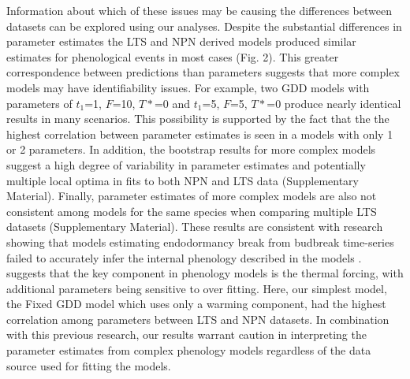 \documentclass[fleqn,10pt,lineno]{wlpeerj} %
\begin{document}
Information about which of these issues may be causing the differences between datasets can be explored using our analyses. Despite the substantial differences in parameter estimates the LTS and NPN derived models produced similar estimates for phenological events in most cases (Fig. 2). This greater correspondence between predictions than parameters suggests that more complex models may have identifiability issues. For example, two GDD models with parameters of $t_{1}$=1, $F$=10, $T*$=0 and $t_{1}$=5, $F$=5, $T*$=0 produce nearly identical results in many scenarios. This possibility is supported by the fact that the the highest correlation between parameter estimates is seen in a models with only 1 or 2 parameters. In addition, the bootstrap results for more complex models suggest a high degree of variability in parameter estimates and potentially multiple local optima in fits to both NPN and LTS data (Supplementary Material). Finally, parameter estimates of more complex models are also not consistent among models for the same species when comparing multiple LTS datasets (Supplementary Material). These results are consistent with research showing that models estimating endodormancy break from budbreak time-series failed to accurately infer the internal phenology described in the models \citep{chuine2016}. \cite{basler2016} suggests that the key component in phenology models is the thermal forcing, with additional parameters being sensitive to over fitting. Here, our simplest model, the Fixed GDD model which uses only a warming component, had the highest correlation among parameters between LTS and NPN datasets. In combination with this previous research, our results warrant caution in interpreting the parameter estimates from complex phenology models regardless of the data source used for fitting the models.
\end{document}

